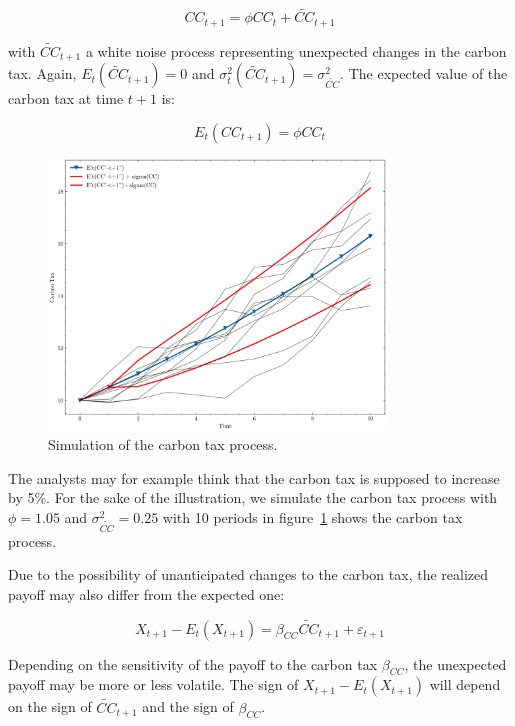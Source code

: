 \begin{equation}
    CC_{t+1} = \phi CC_t + \tilde{CC}_{t+1}
\end{equation}

with $\tilde{CC}_{t+1}$ a white noise process
representing unexpected changes in the carbon tax.
Again, $E_t(\tilde{CC}_{t+1}) = 0$ and
$\sigma_t^2(\tilde{CC}_{t+1}) = \sigma_{\tilde{CC}}^2$.
The expected value of the carbon tax at time $t+1$ is:

\begin{equation}
    E_t(CC_{t+1}) = \phi CC_t
\end{equation}


\begin{figure}[htbp]
    \centering
    \includegraphics[width=0.8\textwidth]{../images/chapter01/carbon_tax_simulations.png}
    \caption{Simulation of the carbon tax process.}
    \label{fig:carbon_tax}
\end{figure}

The analysts may for example think that the carbon 
tax is supposed to increase by 5\%.
For the sake of the illustration, 
we simulate the carbon tax process with
$\phi = 1.05$ and $\sigma_{\tilde{CC}}^2 = 0.25$
with 10 periods
in figure~\ref{fig:carbon_tax} shows the carbon tax process.



Due to the possibility of unanticipated changes 
to the carbon tax,
the realized payoff may also differ from the expected one:

\begin{equation}
    X_{t+1} - E_{t}(X_{t+1}) = \beta_{CC} \tilde{CC}_{t+1} + \varepsilon_{t+1}
\end{equation}

Depending on the sensitivity of the payoff to the carbon tax $\beta_{CC}$,
the unexpected payoff may be more or less volatile.
The sign of $X_{t+1} - E_{t}(X_{t+1})$ will depend on the sign of $\tilde{CC}_{t+1}$
and the sign of $\beta_{CC}$.

